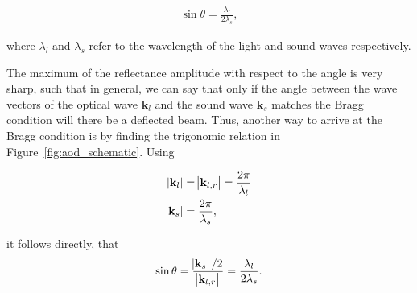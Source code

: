 
\begin{align}
	\sin \theta = \frac{\lambda_l}{2 \lambda_s},
\end{align}

where $\lambda_l$ and $\lambda_s$ refer to the wavelength of the light and sound waves respectively.

The maximum of the reflectance amplitude with respect to the angle is very sharp, such that in general, we can say that only if the angle between the wave vectors of the optical wave $\mathbf{k}_l$ and the sound wave $\mathbf{k}_s$ matches the Bragg condition will there be a deflected beam. Thus, another way to arrive at the Bragg condition is by finding the trigonomic relation in Figure~\ref{fig:aod_schematic}. Using

\begin{align}
	\abs{\mathbf{k}_l} &= \abs{\mathbf{k}_{l,r}} = \frac{2\pi}{\lambda_l} \\
	\abs{\mathbf{k}_s} &= \frac{2\pi}{\lambda_s},
\end{align}

it follows directly, that
\begin{align}
	\label{eq:bragg_trigonometry}
	\sin{\theta} = \frac{\abs{\mathbf{k}_s} / 2}{\abs{\mathbf{k}_{l,r}}} = \frac{\lambda_l}{2\lambda_s}.
\end{align}

\begin{figure}[t]
\end{figure}


